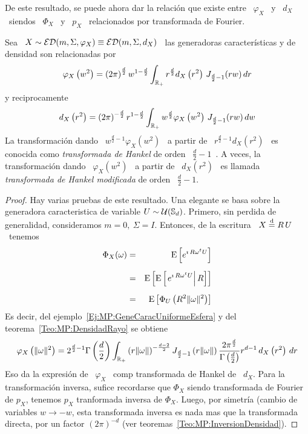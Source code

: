 De  este  resultado,  se puede  ahora  dar  la  relaci\'on  que existe  entre  \
$\varphi_X$ \  y \ $d_X$  \ siendos \  $\Phi_X$ \ y  \ $p_X$ \  relacionados por
transformada de Fourier.
%
\begin{teorema}
%
  Sea  \  $X  \sim   \mathcal{ED}(m,\Sigma,\varphi_X)  \equiv  \mathcal{ED}(m,\Sigma,d_X)$  \  las
  generadoras caracter\'isticas y de densidad son relacionadas por
  \[
  \varphi_X\left(   w^2   \right)   =   \left(   2   \pi   \right)^{\frac{d}{2}}
  w^{1-\frac{d}{2}}  \int_{\mathbb{R}_+}  r^{\frac{d}{2}}  d_X\left( r^2  \right)  \,
  J_{\frac{d}{2}-1}( r w) \, dr
  \]
  y reciprocamente
  \[
  d_X\left( r^2 \right) =  \left( 2 \pi \right)^{-\frac{d}{2}} r^{1-\frac{d}{2}}
  \int_{\mathbb{R}_+}     w^{\frac{d}{2}}    \varphi_X\left(    w^2     \right)    \,
  J_{\frac{d}{2}-1}( r w) \, dw
  \]
  La transformaci\'on dando \  $w^{\frac{d}{2}-1} \varphi_X\left( w^2 \right)$ \
  a partir  de \  $r^{\frac{d}{2}-1} d_X\left( r^2  \right)$ \ es  conocida como
  {\em transformada de Hankel} de orden \ $\frac{d}{2}-1$~\cite{Lor54, Pou10}. A
  veces, la transformaci\'on dando \ $\varphi_X\left( w^2 \right)$ \ a partir de
  \ $d_X\left( r^2 \right)$ \ es llamada {\em transformada de Hankel modificada}
  de orden \ $\frac{d}{2}-1$.
\end{teorema}
%
\begin{proof}
  Hay varias pruebas de este resultado. Una elegante se basa sobre la generadora
  caracteristica  de variable  $U  \sim \mathcal{U}(\mathbb{S}_d)$.  Primero,  sin perdida  de
  generalidad, consideramos $m = 0, \:  \Sigma = I$. Entonces, de la escritura \
  $X \stackrel{\mathrm{d}}{=} R \, U$ \ tenemos
  \begin{eqnarray*}
  \Phi_X(\omega) & = & \operatorname{E}\left[ e^{\imath \, R \omega^t U} \right]\\[2mm]
  & = & \operatorname{E}\left[ \operatorname{E}\left[ \left. e^{\imath \, R \omega^t U} \right| R \right]
  \right]\\[2mm]
  & = & \operatorname{E}\left[ \Phi_U\left( R^2 \| \omega \|^2 \right)  \right]
  \end{eqnarray*}
  Es    decir,    del    ejemplo~\ref{Ej:MP:GeneCaracUniformeEsfera}    y    del
  teorema~\ref{Teo:MP:DensidadRayo} se obtiene
  \[
  \varphi_X\left(  \|  \omega  \|^2  \right)  =  2^{\frac{d}{2}-1}  \Gamma\left(
    \frac{d}{2}  \right)  \int_{\mathbb{R}_+}  \left(   r  \|  \omega  \|  \right)^{-
    \frac{d-2}{2}}  J_{\frac{d}{2}-1}  \left( r  \|  \omega  \| \right)  \frac{2
    \pi^{\frac{d}{2}}}{\Gamma\left(  \frac{d}{2} \right)}  r^{d-1}  \, d_X\left(
    r^2 \right) \, dr
  \]
  Eso da  la expresi\'on  de \ $\varphi_X$  \ comp  transformada de Hankel  de \
  $d_X$. Para la transformaci\'on inversa, sufice recordarse que $\Phi_X$ siendo
  transformada  de  Fourier  de  $p_X$,  tenemos $p_X$  tranformada  inversa  de
  $\Phi_X$.  Luego,  por  simetr\'ia  (cambio  de variables  $w  \to  -w$,  esta
  transformada inversa  es nada mas que  la transformada directa,  por un factor
  $(2 \pi)^{-d}$ (ver teoremas~\ref{Teo:MP:InversionDensidad}).
\end{proof}

